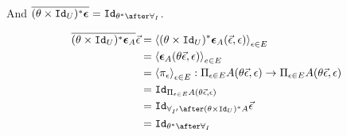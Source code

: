\documentclass{report}
\begin{document}
And $\bar{(\theta\times\Id{U})\star \counit{}} = \Id{\theta\star\after\allI}$.

\begin{align}
    \bar{(\theta\times\Id{U})\star \counit{A}} \ev  & = \finpr{(\theta\times\Id{U})\star\counit{A}(\ev, \e)}{\e\in E}\\
    & = \finpr{\counit{A}(\theta\ev, \e)}{e\in E}\\
    & = \finpr{\pi_\e}{\e\in E}: \Pi_{\e\in E}A(\theta\ev, \e) \rightarrow \Pi_{\e\in E}A(\theta\ev, \e)\\
    & = \Id{\Pi_{\e\in E}A(\theta\ev, \e)}\\
    & = \Id{\allII\after(\theta\times\Id{U})\star A}\ev\\
    & = \Id{\theta\star\after\allI}
\end{align}
\end{document}
